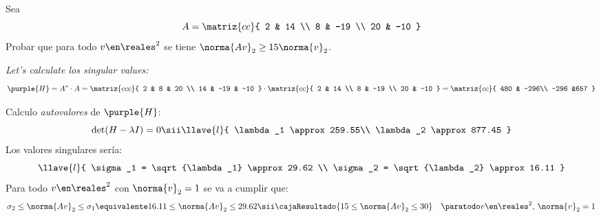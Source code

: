 \begin{enunciado}{\ejercicio}
  Sea
  $$
    A =
    \matriz{cc}{
      2 & 14 \\
      8 & -19 \\
      20 & -10
    }
  $$
  Probar que para todo $v \en \reales^2$ se tiene $\norma{Av}_2 \geq 15 \norma{v}_2$.
\end{enunciado}

\textit{Let's calculate los singular values:}
$$
  \purple{H} =
  A^* \cdot A =
  \matriz{ccc}{
    2 & 8 & 20 \\
    14 & -19 & -10
  }
  \cdot
  \matriz{cc}{
    2 & 14 \\
    8 & -19 \\
    20 & -10
  }
  =
  \matriz{cc}{
    480 & -296\\
    -296  &657
  }
$$

Calculo \textit{autovalores} de $\purple{H}$:
$$
  \det(H - \lambda I) = 0
  \sii
  \llave{l}{
    \lambda_1 \approx 259.55\\
    \lambda_2 \approx 877.45
  }
$$
Los valores singulares sería:
$$
  \llave{l}{
    \sigma_1  = \sqrt{\lambda_1} \approx 29.62 \\
    \sigma_2  = \sqrt{\lambda_2} \approx 16.11
  }
$$
Para todo $v \en \reales^2$ con $\norma{v}_2 = 1$ se va a cumplir que:
$$
  \sigma_2 \leq \norma{Av}_2 \leq \sigma_1
  \equivalente
  16.11 \leq \norma{Av}_2 \leq 29.62
  \sii
  \cajaResultado{
    15 \leq \norma{Av}_2 \leq 30
  }
  \quad \paratodo v \en \reales^2,\, \norma{v}_2 = 1
$$

